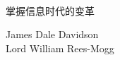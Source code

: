 \thispagestyle{empty}
\begin{titlepage}
\thispagestyle{empty}
    \begin{center}
    
    \vspace*{5cm}
    {\makeatletter
    \fontsize{58}{58}\rmfamily\bfseries\selectfont\@title
    \makeatother}
    \\
    \Huge{掌握信息时代的变革}
    
    \bigskip
    \bigskip
    James Dale Davidson \\
	Lord William Rees-Mogg
    \bigskip
    \bigskip
    \bigskip

    {\makeatletter
    \fontsize{22}{22}\rmfamily\selectfont\@author
    \makeatother}
    
    \bigskip
    \bigskip

    
    \vfill
    
    
    \bigskip
    \bigskip
    
    {\makeatletter
    \fontsize{25}{25}\rmfamily\selectfont\@pressname
    \makeatother}
    \end{center}
\end{titlepage}

\let\cleardoublepage\clearpage

\thispagestyle{empty}


